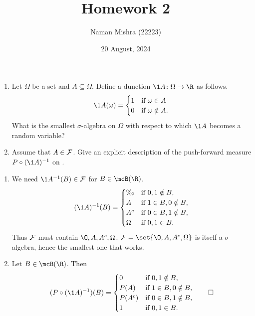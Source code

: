 \documentclass[12pt]{article}
\title{Homework 2}
\author{Naman Mishra (22223)}
\date{20 August, 2024}
\begin{document}
\maketitle

\begin{problem} \leavevmode
    \begin{enumerate}[(1)]
        \item Let $\Omega$ be a set and $A \subseteq \Omega$.
        Define a dunction $\1A\colon \Omega \to \R$ as follows. \[
            \1A(\omega) = \begin{cases}
                1 & \text{if } \omega \in A \\
                0 & \text{if } \omega \notin A.
            \end{cases}
        \] What is the smallest $\sigma$-algebra on $\Omega$ with respect to
        which $\1A$ becomes a random variable?
        \item Assume that $A \in \mathcal F$.
        Give an explicit description of the push-forward measure
        $P \circ (\1A)^{-1}$ on \R.
    \end{enumerate}
\end{problem}
\begin{solution} \leavevmode
    \begin{enumerate}[(1)]
        \item We need $\1A^{-1}(B) \in \F$ for $B \in \mcB(\R)$. \[
                (\1A)^{-1}(B) = \begin{cases}
                    \O & \text{if } 0, 1 \notin B, \\
                    A & \text{if } 1 \in B, 0 \notin B, \\
                    A^c & \text{if } 0 \in B, 1 \notin B, \\
                    \Omega & \text{if } 0, 1 \in B.
                \end{cases}
            \]
            Thus $\mathcal F$ must contain $\O, A, A^c, \Omega$.
            $\F = \set{\O, A, A^c, \Omega}$ is itself a $\sigma$-algebra,
            hence the smallest one that works.
        \item Let $B \in \mcB(\R)$. Then \[
        (P \circ (\1A)^{-1})(B) = \begin{cases}
                0 & \text{if } 0, 1 \notin B, \\
                P(A) & \text{if } 1 \in B, 0 \notin B, \\
                P(A^c) & \text{if } 0 \in B, 1 \notin B, \\
                1 & \text{if } 0, 1 \in B.
            \end{cases} \qedhere
        \]
    \end{enumerate}
\end{solution}
\end{document}
